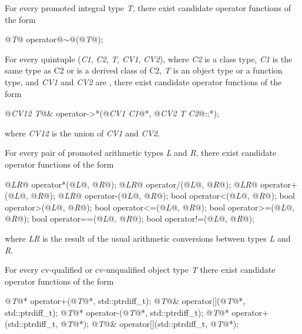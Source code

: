 \pnum
For every promoted integral type
\textit{T},
there exist candidate operator functions of the form

\begin{codeblock}
@\textit{T}@ operator@$\sim$@(@\textit{T}@);
\end{codeblock}

\pnum
For every quintuple
(\textit{C1},
\textit{C2},
\textit{T},
\textit{CV1},
\textit{CV2}),
where
\textit{C2}
is a class type,
\textit{C1}
is the same type as C2 or is a derived class of C2,
\textit{T}
is an object type or a function type,
and
\textit{CV1}
and
\textit{CV2}
are
,
there exist candidate operator functions of the form

\begin{codeblock}
@\textit{CV12 T}@& operator->*(@\textit{CV1 C1}@*, @\textit{CV2 T C2}@::*);
\end{codeblock}

where
\textit{CV12}
is the union of
\textit{CV1}
and
\textit{CV2}.

\pnum
For every pair of promoted arithmetic types
\textit{L}
and
\textit{R},
there exist candidate operator functions of the form

\begin{codeblock}
@\textit{LR}@      operator*(@\textit{L}@, @\textit{R}@);
@\textit{LR}@      operator/(@\textit{L}@, @\textit{R}@);
@\textit{LR}@      operator+(@\textit{L}@, @\textit{R}@);
@\textit{LR}@      operator-(@\textit{L}@, @\textit{R}@);
bool    operator<(@\textit{L}@, @\textit{R}@);
bool    operator>(@\textit{L}@, @\textit{R}@);
bool    operator<=(@\textit{L}@, @\textit{R}@);
bool    operator>=(@\textit{L}@, @\textit{R}@);
bool    operator==(@\textit{L}@, @\textit{R}@);
bool    operator!=(@\textit{L}@, @\textit{R}@);
\end{codeblock}

where
\textit{LR}
is the result of the usual arithmetic conversions between types
\textit{L}
and
\textit{R}.

\pnum
For every cv-qualified or cv-unqualified object type
\textit{T}
there exist candidate operator functions of the form

\begin{codeblock}
@\textit{T}@*      operator+(@\textit{T}@*, std::ptrdiff_t);
@\textit{T}@&      operator[](@\textit{T}@*, std::ptrdiff_t);
@\textit{T}@*      operator-(@\textit{T}@*, std::ptrdiff_t);
@\textit{T}@*      operator+(std::ptrdiff_t, @\textit{T}@*);
@\textit{T}@&      operator[](std::ptrdiff_t, @\textit{T}@*);
\end{codeblock}

